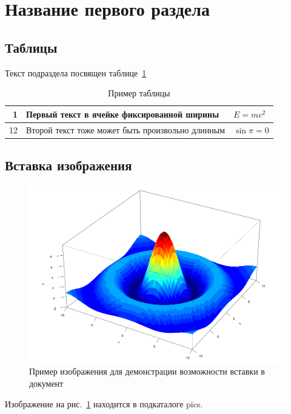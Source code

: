 
\section{Название первого раздела}

\subsection{Таблицы}

Текст подраздела посвящен таблице~\ref{tab:t1}

\begin{table}[H]
\caption{Пример таблицы}
\label{tab:t1}
\begin{center}
\begin{tabular}{|r|p{5.5cm}|p{2.5cm}|}
\hline 
1 & Первый текст в ячейке фиксированной ширины & $E=mc^2 $ \\ 
\hline 
12 & Второй текст тоже может быть произвольно длинным & $\sin \pi = 0 $ \\ 
\hline 
\end{tabular} 
\end{center}
\end{table}

\subsection{Вставка изображения}

\begin{figure}[H]
	\centering
	\includegraphics[width=0.7\linewidth]{pics/pic3D}
	\caption{Пример изображения для демонстрации возможности вставки в документ}
	\label{fig:pic3d}
\end{figure}



Изображение на рис.~\ref{fig:pic3d} находится в подкаталоге pics.

